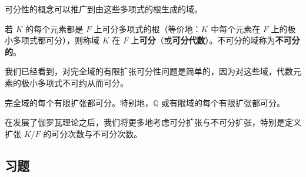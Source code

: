 可分性的概念可以推广到由这些多项式的根生成的域。

\begin{definition}
若 \(K\) 的每个元素都是 \(F\) 上可分多项式的根（等价地：\(K\) 中每个元素在 \(F\) 上的极小多项式都可分），则称域 \(K\) 在 \(F\) 上\textbf{可分}（或\textbf{可分代数}）。不可分的域称为\textbf{不可分的}。
\end{definition}

我们已经看到，对完全域的有限扩张可分性问题是简单的，因为对这些域，代数元素的极小多项式不可约从而可分。

\begin{corollary}\label{cor:13.39}
完全域的每个有限扩张都可分。特别地，\(\mathbb{Q}\) 或有限域的每个有限扩张都可分。
\end{corollary}

在发展了伽罗瓦理论之后，我们将更多地考虑可分扩张与不可分扩张，特别是定义扩张 \(K/F\) 的可分次数与不可分次数。

\subsection*{习题}

